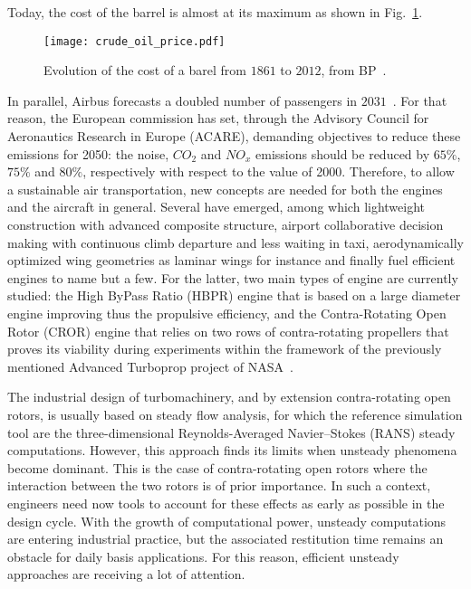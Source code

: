 Today, the cost of the barrel is almost at its maximum as shown
in Fig.~\ref{fig:crude_oil_price}.
\begin{figure}[htp]
  \centering
  \texttt{[image: crude\_oil\_price.pdf]}
  \caption{Evolution of the cost of a barel from $1861$ to $2012$, from BP~\cite{bpreview2013}.}
  \label{fig:crude_oil_price}
\end{figure}
In parallel, Airbus forecasts a doubled number of passengers in
$2031$~\cite{AirbusForecast2013}. For that reason, the European commission has set, through the
Advisory Council for Aeronautics Research in Europe (ACARE),
demanding objectives to reduce these emissions for 2050:
the noise, $CO_2$ and $NO_x$ emissions should be reduced by 
$65\%$, $75\%$ and $80\%$, respectively with respect to
the value of 2000.
Therefore, to allow a sustainable air transportation, new
concepts are needed for both the engines and the 
aircraft in general.
Several have emerged, among which lightweight construction
with advanced composite structure, airport collaborative decision
making with continuous climb departure and less waiting in taxi,
aerodynamically optimized wing geometries as laminar wings for instance
and finally fuel efficient engines to name but a few.
For the latter, two main types of engine are currently studied: the
High ByPass Ratio (HBPR) engine that is based on a
large diameter engine improving thus the
propulsive efficiency, and the Contra-Rotating Open Rotor (CROR)
engine that relies on two rows of contra-rotating propellers
that proves its viability during experiments within the framework of
the previously mentioned Advanced Turboprop project of NASA~\cite{Hager1988}.
\newline 

The industrial design of turbomachinery, and by extension contra-rotating
open rotors, is usually based on steady flow analysis, 
for which the reference simulation tool are the three-dimensio\-nal Reynolds-Averaged 
Navier--Stokes (RANS) steady computations. However, this approach finds its limits 
when unsteady phenomena become dominant. This is the case of 
contra-rotating open rotors where the interaction between the
two rotors is of prior importance. 
In such a
context, engineers need now tools to account for these effects as
early as possible in the design cycle. With the growth of
computational power, unsteady computations are entering industrial
practice, but the associated restitution time remains an obstacle for
daily basis applications.  For this reason, efficient
unsteady approaches are receiving a lot of attention. 

